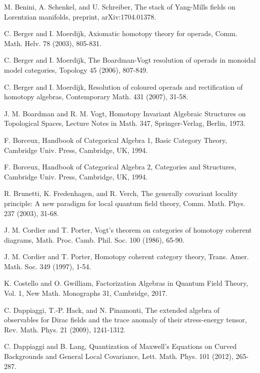 \documentclass{amsbook}
\numberwithin{section}{chapter}
\numberwithin{subsection}{section}
\numberwithin{equation}{section}
\theoremstyle{plain}
\theoremstyle{definition}
\begin{document}
\begin{thebibliography}{AAAAAA}
M. Benini, A. Schenkel, and U. Schreiber, The stack of Yang-Mills fields on Lorentzian manifolds, preprint, arXiv:1704.01378.

C. Berger and I. Moerdijk, Axiomatic homotopy theory for operads, Comm. Math. Helv. 78 (2003), 805-831.

C. Berger and I. Moerdijk, The Boardman-Vogt resolution of operads in monoidal model categories, Topology 45 (2006), 807-849. 

C. Berger and I. Moerdijk, Resolution of coloured operads and rectification of homotopy algebras, Contemporary Math. 431 (2007), 31-58.

J. M. Boardman and R. M. Vogt, Homotopy Invariant Algebraic Structures on Topological Spaces, Lecture Notes in Math. 347, Springer-Verlag, Berlin, 1973.

F. Borceux, Handbook of Categorical Algebra 1, Basic Category Theory, Cambridge Univ. Press, Cambridge, UK, 1994.

F. Borceux, Handbook of Categorical Algebra 2, Categories and Structures, Cambridge Univ. Press, Cambridge, UK, 1994.

R. Brunetti, K. Fredenhagen, and R. Verch, The generally covariant locality principle: A new paradigm for local quantum field theory, Comm. Math. Phys. 237 (2003), 31-68.

J. M. Cordier and T. Porter, Vogt's theorem on categories of homotopy coherent diagrams, Math. Proc. Camb. Phil. Soc. 100 (1986), 65-90.

J. M. Cordier and T. Porter, Homotopy coherent category theory, Trans. Amer. Math. Soc. 349 (1997), 1-54.

K. Costello and O. Gwilliam, Factorization Algebras in Quantum Field Theory, Vol. 1, New Math. Monographs 31, Cambridge, 2017.

C. Dappiaggi, T.-P. Hack, and N. Pinamonti, The extended algebra of observables for Dirac fields and the trace anomaly of their stress-energy tensor, Rev. Math. Phys. 21 (2009), 1241-1312.

C. Dappiaggi and B. Lang, Quantization of Maxwell’s Equations on Curved Backgrounds and General Local Covariance, Lett. Math. Phys. 101 (2012), 265-287.


\end{thebibliography}
\end{document}
